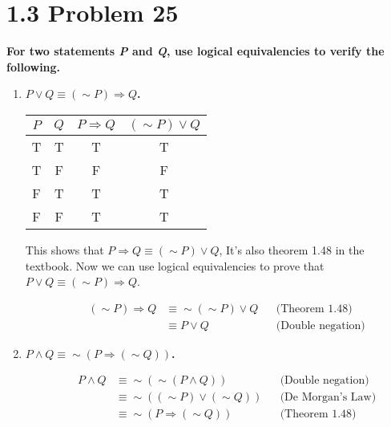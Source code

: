 \documentclass[10pt]{article}
\begin{document}
\section{1.3 Problem 25}
\textbf{For two statements \textit{P} and \textit{Q}, use logical equivalencies
to verify the following.}

\begin{enumerate}[label=(\alph*)]

    \item \textbf{$P \vee Q \equiv (\sim P) \Rightarrow Q$.}

        \begin{table}[ht]
            \centering
            \begin{tabular}{|c|c|c|c|}

                \hline
                $P$ & $Q$ & $P \Rightarrow Q$ & $(\sim P) \vee Q$ \\
                \hline
                \hline
                T & T & \cellcolor[gray]{0.8} T & \cellcolor[gray]{0.8} T \\
                \hline
                T & F & \cellcolor[gray]{0.8} F & \cellcolor[gray]{0.8} F \\
                \hline
                F & T & \cellcolor[gray]{0.8} T & \cellcolor[gray]{0.8} T \\
                \hline
                F & F & \cellcolor[gray]{0.8} T & \cellcolor[gray]{0.8} T \\
                \hline

            \end{tabular}
        \end{table}

    This shows that $P \Rightarrow Q \equiv (\sim P) \vee Q$, It's also theorem
    1.48 in the textbook. Now we can use logical equivalencies to prove that 
    $P \vee Q \equiv (\sim P) \Rightarrow Q$.

    \begin{align*}
        && (\sim P) \Rightarrow Q &\equiv \sim (\sim P) \vee Q && \text{(Theorem 1.48)} \\
        && &\equiv P \vee Q && \text{(Double negation)} 
    \end{align*}

    \item \textbf{$P \wedge Q \equiv \sim (P \Rightarrow (\sim Q))$.}

    \begin{align*}
        && P \wedge Q &\equiv \sim (\sim (P \wedge Q)) && \text{(Double negation)} \\
        && &\equiv \sim ((\sim P) \vee (\sim Q)) && \text{(De Morgan's Law)} \\
        && &\equiv \sim (P \Rightarrow (\sim Q)) && \text{(Theorem 1.48)} \\
    \end{align*}
        

\end{enumerate}
\end{document}
